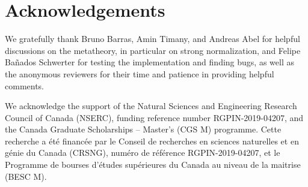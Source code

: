 \makeatletter
\renewcommand\@seccntformat[1]{}
\makeatother

\section{Acknowledgements}

We gratefully thank Bruno Barras, Amin Timany, and Andreas Abel for helpful discussions on the metatheory,
in particular on strong normalization,
and Felipe Ba\~nados Schwerter for testing the implementation and finding bugs,
as well as the anonymous reviewers for their time and patience in providing helpful comments.

We acknowledge the support of the Natural Sciences and Engineering Research Council of Canada (NSERC), funding reference number RGPIN-2019-04207,
and the Canada Graduate Scholarships -- Master’s (CGS M) programme.
Cette recherche a \'et\'e financ\'ee par le Conseil de recherches en sciences naturelles et en g\'enie du Canada (CRSNG), num\'ero de r\'ef\'erence RGPIN-2019-04207,
et le Programme de bourses d’\'etudes sup\'erieures du Canada au niveau de la maitrise (BESC M).
